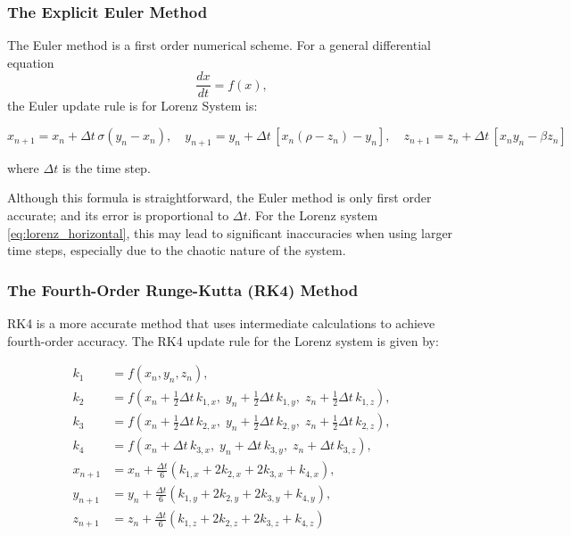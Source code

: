 \subsubsection{The Explicit Euler Method}

The Euler method is a first order numerical scheme. For a general differential equation 
\[
\frac{dx}{dt} = f(x),
\]
the Euler update rule is for Lorenz System is:

\begin{equation}
x_{n+1} = x_n + \Delta t\, \sigma (y_n - x_n), \quad
y_{n+1} = y_n + \Delta t\, [x_n(\rho - z_n) - y_n], \quad
z_{n+1} = z_n + \Delta t\, [x_n y_n - \beta z_n]
\end{equation}

\begin{center}
where $\Delta t$ is the time step.
\end{center}


Although this formula is straightforward, the Euler method is only first order accurate; and its error is proportional to $\Delta t$. For the Lorenz system \ref{eq:lorenz_horizontal}, this may lead to significant inaccuracies when using larger time steps, especially due to the chaotic nature of the system.

\subsubsection{The Fourth-Order Runge-Kutta (RK4) Method}

RK4 is a more accurate method that uses intermediate calculations to achieve fourth-order accuracy. The RK4 update rule for the Lorenz system is given by:

\begin{equation}
\begin{aligned}
k_1 &= f(x_n, y_n, z_n), \\
k_2 &= f\left(x_n + \tfrac{1}{2} \Delta t\, k_{1,x},\; y_n + \tfrac{1}{2} \Delta t\, k_{1,y},\; z_n + \tfrac{1}{2} \Delta t\, k_{1,z} \right), \\
k_3 &= f\left(x_n + \tfrac{1}{2} \Delta t\, k_{2,x},\; y_n + \tfrac{1}{2} \Delta t\, k_{2,y},\; z_n + \tfrac{1}{2} \Delta t\, k_{2,z} \right), \\
k_4 &= f\left(x_n + \Delta t\, k_{3,x},\; y_n + \Delta t\, k_{3,y},\; z_n + \Delta t\, k_{3,z} \right), \\
x_{n+1} &= x_n + \frac{\Delta t}{6} \left( k_{1,x} + 2k_{2,x} + 2k_{3,x} + k_{4,x} \right), \\
y_{n+1} &= y_n + \frac{\Delta t}{6} \left( k_{1,y} + 2k_{2,y} + 2k_{3,y} + k_{4,y} \right), \\
z_{n+1} &= z_n + \frac{\Delta t}{6} \left( k_{1,z} + 2k_{2,z} + 2k_{3,z} + k_{4,z} \right)
\end{aligned}
\end{equation}


